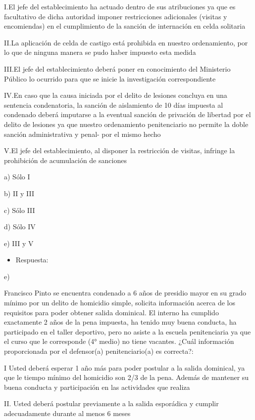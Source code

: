 \documentclass[letterpaper, 11pt]{article}
\begin{document}
I.El jefe del establecimiento ha actuado dentro de sus atribuciones ya que es
facultativo de dicha autoridad imponer restricciones adicionales (visitas y
encomiendas) en el cumplimiento de la sanción de internación en celda solitaria

II.La aplicación de celda de castigo está prohibida en nuestro ordenamiento, por lo
que de ninguna manera se pudo haber impuesto esta medida

III.El jefe del establecimiento deberá poner en conocimiento del Ministerio Público lo
ocurrido para que se inicie la investigación correspondiente

IV.En caso que la causa iniciada por el delito de lesiones concluya en una sentencia
condenatoria, la sanción de aislamiento de 10 días impuesta al condenado deberá
imputarse a la eventual sanción de privación de libertad por el delito de lesiones ya
que nuestro ordenamiento penitenciario no permite la doble sanción administrativa y penal- por el mismo hecho

V.El jefe del establecimiento, al disponer la restricción de visitas, infringe la
prohibición de acumulación de sanciones

a) Sólo I

b) II y III

c) Sólo III

d) Sólo IV

e) III y V

\begin{itemize}
\item Respuesta:
\end{itemize}
e)


Francisco Pinto se encuentra condenado a 6 años de presidio mayor en su
grado mínimo por un delito de homicidio simple, solicita información acerca de
los requisitos para poder obtener salida dominical. El interno ha cumplido
exactamente 2 años de la pena impuesta, ha tenido muy buena conducta, ha
participado en el taller deportivo, pero no asiste a la escuela penitenciaria ya
que el curso que le corresponde (4° medio) no tiene vacantes. ¿Cuál
información proporcionada por el defensor(a) penitenciario(a) es correcta?:

I Usted deberá esperar 1 año más para poder postular a la salida dominical, ya que
le tiempo mínimo del homicidio son 2/3 de la pena. Además de mantener su buena
conducta y participación en las actividades que realiza

II. Usted deberá postular previamente a la salida esporádica y cumplir
adecuadamente durante al menos 6 meses
\end{document}

